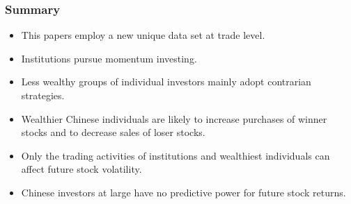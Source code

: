 \documentclass{beamer}
\begin{document}
\begin{frame}
    \frametitle{Summary}
    \begin{itemize}
        \item This papers employ a new unique data set at trade level.
        \item Institutions pursue momentum investing.
        \item Less wealthy groups of individual investors mainly adopt contrarian strategies.
        \item Wealthier Chinese individuals are likely to increase purchases of winner stocks and to decrease sales of loser stocks.
        \item Only the trading activities of institutions and wealthiest individuals can aﬀect future stock volatility.
        \item Chinese investors at large have no predictive power for future stock returns.
    \end{itemize}
\end{frame}
\end{document}
